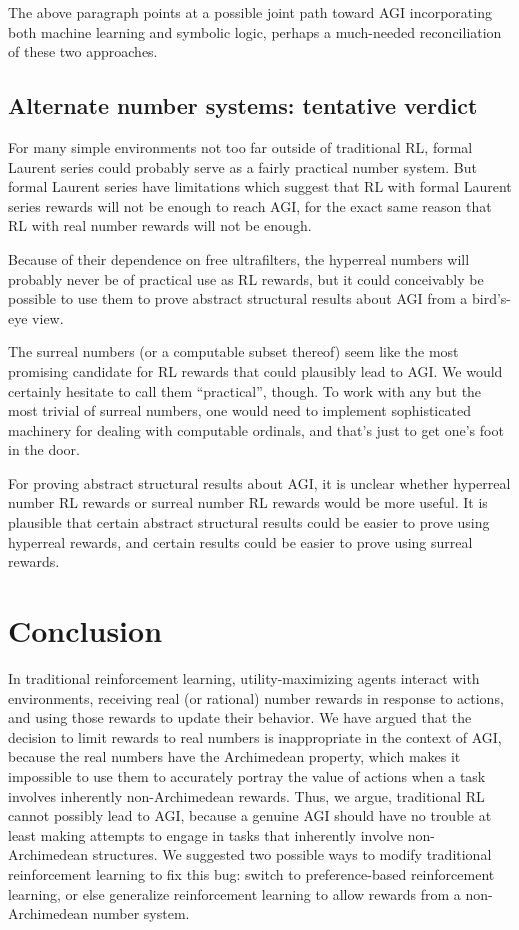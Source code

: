 \documentclass[reqno]{article}
\theoremstyle{definition}
\begin{document}
The above paragraph points at a possible joint path
toward AGI incorporating both machine learning and symbolic logic, perhaps
a much-needed reconciliation of these two approaches.

\subsection{Alternate number systems: tentative verdict}

For many simple environments not too far outside of traditional RL,
formal Laurent series could probably serve as a fairly practical number system.
But formal Laurent series have limitations which suggest that RL
with formal Laurent series rewards will not be enough to reach AGI, for the exact
same reason that RL with real number rewards will not be enough.

Because of their dependence on free ultrafilters, the hyperreal numbers will
probably never be of practical use as RL rewards, but it could conceivably be
possible to use them to prove abstract structural results about AGI from a
bird's-eye view.

The surreal numbers (or a computable subset thereof) seem like the most promising
candidate for RL rewards that could plausibly lead to AGI. We would certainly
hesitate to call them ``practical'', though. To work with any but the most trivial
of surreal numbers, one would need to implement sophisticated machinery for
dealing with computable ordinals, and that's just to get one's foot in the door.

For proving abstract structural results about AGI, it is unclear
whether hyperreal number RL rewards or surreal number RL rewards would be more
useful. It is plausible that certain abstract structural results could be easier
to prove using hyperreal rewards, and certain results could be easier to
prove using surreal rewards.


\section{Conclusion}
\label{conclusionsection}

In traditional reinforcement learning, utility-maximizing agents interact
with environments, receiving real (or rational) number rewards in response to
actions, and using those rewards to update their behavior. We have argued that
the decision to limit rewards to real numbers is inappropriate in the context
of AGI, because the real numbers have the Archimedean property, which makes it
impossible to use them to accurately portray the value of actions when a task
involves inherently non-Archimedean rewards. Thus, we argue, traditional
RL cannot possibly lead to AGI, because a genuine AGI should have no trouble
at least making attempts to engage in tasks that inherently involve
non-Archimedean structures. We suggested two possible ways
to modify traditional reinforcement learning to fix this bug: switch to
preference-based reinforcement learning, or else generalize reinforcement learning
to allow rewards from a non-Archimedean number system.
\end{document}

